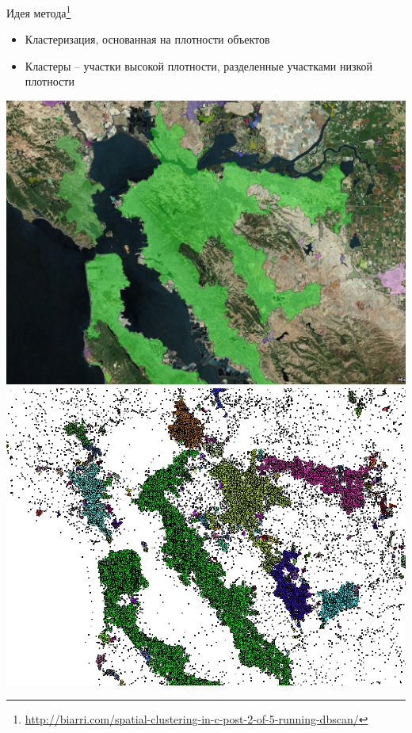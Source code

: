 \documentclass[aspectratio=169]{beamer}
\begin{document}
\begin{frame}{Идея метода\footnote{\url{http://biarri.com/spatial-clustering-in-c-post-2-of-5-running-dbscan/}}}

\begin{itemize}
\item Кластеризация, основанная на плотности объектов
\item Кластеры -- участки высокой плотности, разделенные участками низкой плотности
\end{itemize}

\vspace{1em}
\begin{center}
\includegraphics[height=0.4\textheight]{images/dbscan1.png}
\includegraphics[height=0.4\textheight]{images/dbscan2.png}
\end{center}


\end{frame}
\end{document}
